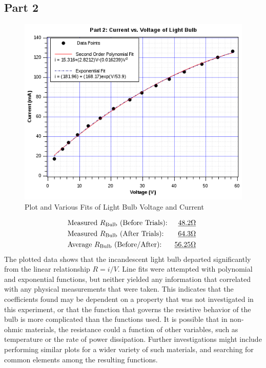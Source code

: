\documentclass[twocolumn,english]{IEEEtran}
\theoremstyle{plain}
\theoremstyle{plain}
\begin{document}
\subsection*{Part 2}
  \begin{figure}[H]
  \begin{centering}
  \begin{center}
  \includegraphics[width=\linewidth]{./Pictures/part2graph.png}
  \caption{Plot and Various Fits of Light Bulb Voltage and Current}
  \label{fig:graph_part2}
  \end{center}
  \par\end{centering}
  \end{figure}
  \begin{align*}
  &\text{Measured $R_{\text{Bulb}}$ (Before Trials):} 		&\text{\underline{48.2$\Omega$} } 	\\
  &\text{Measured $R_{\text{Bulb}}$ (After Trials):} 		&\text{\underline{64.3$\Omega$} }	\\
  &\text{Average $R_{\text{Bulb}}$ (Before/After):}		&\text{\underline{56.25$\Omega$} }	\\
  \end{align*}
  The plotted data shows that the incandescent light bulb departed significantly from the linear relationship $R=i/V$. Line fits were attempted with polynomial and exponential functions, but neither yielded any information that correlated with any physical measurements that were taken. This indicates that the coefficients found may be dependent on a property that was not investigated in this experiment, or that the function that governs the resistive behavior of the bulb is more complicated than the functions used. It is possible that in non-ohmic materials, the resistance could a function of other variables, such as temperature or the rate of power dissipation. Further investigations might include performing similar plots for a wider variety of such materials, and searching for common elements among the resulting functions.
\end{document}
